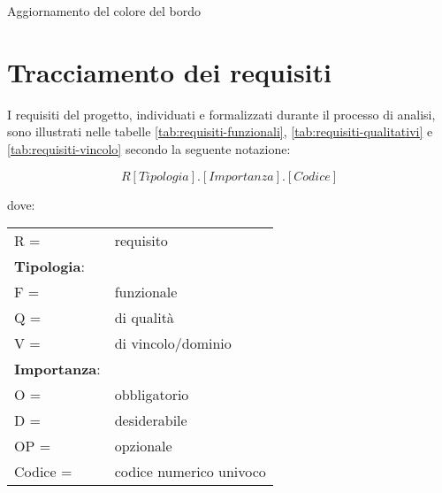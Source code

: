 \begin{usecase}{23.3}{Aggiornamento del colore del bordo}\label{UC23point3}
\end{usecase}

\clearpage

\section{Tracciamento dei requisiti}

I \gls{requisiti} del progetto, individuati e formalizzati durante il processo di analisi, sono illustrati nelle tabelle \ref{tab:requisiti-funzionali}, \ref{tab:requisiti-qualitativi} e \ref{tab:requisiti-vincolo} secondo la seguente notazione:

\textbf{\[R[Tipologia].[Importanza].[Codice]\]} 

dove:

\vspace{20pt}
\begin{tabular}{@{}ll@{}}
    R = & requisito \\
    \textbf{Tipologia}: & \\
    \quad F = & funzionale \\
    \quad Q = & di qualità \\
    \quad V = & di vincolo/dominio \\
    \textbf{Importanza}: & \\
    \quad O = & obbligatorio \\
    \quad D = & desiderabile \\  
    \quad OP = & opzionale \\
    Codice = & codice numerico univoco \\
\end{tabular}
    
\vspace{30pt}

